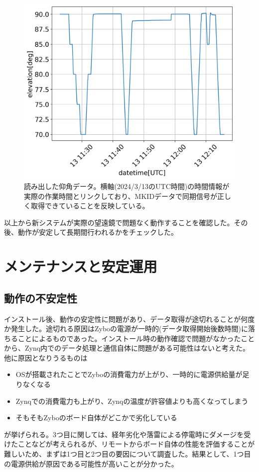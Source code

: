 \begin{figure}[htbp]
  \centering
  \includegraphics[width=0.8\columnwidth]{4_elDAQ/figs/elevation_data.png}
  \caption{読み出した仰角データ。横軸(2024/3/13のUTC時間)の時間情報が実際の作業時間とリンクしており、MKIDデータで同期信号が正しく取得できていることを反映している。}
  \label{elevation_data}
\end{figure}

以上から新システムが実際の望遠鏡で問題なく動作することを確認した。その後、動作が安定して長期間行われるかをチェックした。

\section{メンテナンスと安定運用}

\subsection{動作の不安定性}
インストール後、動作の安定性に問題があり、データ取得が途切れることが何度か発生した。途切れる原因はZyboの電源が一時的(データ取得開始後数時間)に落ちることによるものであった。インストール時の動作確認で問題がなかったことから、Zynq内でのデータ処理と通信自体に問題がある可能性はないと考えた。他に原因となりうるものは
\begin{itemize}
  \item OSが搭載されたことでZyboの消費電力が上がり、一時的に電源供給量が足りなくなる
  \item Zynqでの消費電力も上がり、Zynqの温度が許容値よりも高くなってしまう
  \item そもそもZyboのボード自体がどこかで劣化している
\end{itemize}
が挙げられる。3つ目に関しては、経年劣化や落雷による停電時にダメージを受けたことなどが考えられるが、リモートからボード自体の性能を評価することが難しいため、まずは1つ目と2つ目の要因について調査した。結果として、1つ目の電源供給が原因である可能性が高いことが分かった。

